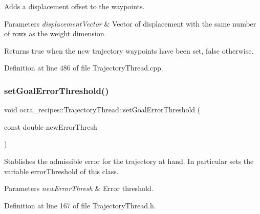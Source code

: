 Adds a displacement offset to the waypoints.


\begin{DoxyParams}{Parameters}
{\em displacement\+Vector} & Vector of displacement with the same number of rows as the weight dimension.\\
\hline
\end{DoxyParams}
\begin{DoxyReturn}{Returns}
true when the new trajectory waypoints have been set, false otherwise. 
\end{DoxyReturn}


Definition at line 486 of file Trajectory\+Thread.\+cpp.

\hypertarget{classocra__recipes_1_1TrajectoryThread_a78eb7665f07bbdbd79bbc4553fb9d0e3}{}\label{classocra__recipes_1_1TrajectoryThread_a78eb7665f07bbdbd79bbc4553fb9d0e3} 
\subsubsection{\texorpdfstring{set\+Goal\+Error\+Threshold()}{setGoalErrorThreshold()}}
{\footnotesize\ttfamily void ocra\+\_\+recipes\+::\+Trajectory\+Thread\+::set\+Goal\+Error\+Threshold (\begin{DoxyParamCaption}\item[{const double}]{new\+Error\+Thresh }\end{DoxyParamCaption})\hspace{0.3cm}{\ttfamily [inline]}}

Stablishes the admissible error for the trajectory at hand. In particular sets the variable error\+Threshold of this class.


\begin{DoxyParams}{Parameters}
{\em new\+Error\+Thresh} & Error threshold. \\
\hline
\end{DoxyParams}


Definition at line 167 of file Trajectory\+Thread.\+h.

\hypertarget{classocra__recipes_1_1TrajectoryThread_af09fa5d00ba024d18fd85870f878c1dd}{}\label{classocra__recipes_1_1TrajectoryThread_af09fa5d00ba024d18fd85870f878c1dd} 
